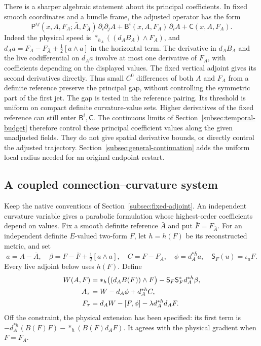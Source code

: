 \documentclass[11pt]{article}
\numberwithin{equation}{section}
\theoremstyle{definition}
\theoremstyle{remark}
\begin{document}
There is a sharper algebraic statement about its principal coefficients.
In fixed smooth coordinates and a bundle frame, the adjusted operator
has the form
\[
 \mathsf P^{ij}(x,A,F_A;\bar A,F_{\bar A})\,\partial_i\partial_j A
 +\mathsf B^i(x,A,F_A)\,\partial_iA+\mathsf C(x,A,F_A).
\]
Indeed the physical speed is
$*_{h_A}((d_AB_A)\wedge F_A)$, and
$d_Aa=F_A-F_{\bar A}+\tfrac12[a\wedge a]$ in the horizontal
term. The derivative in $d_AB_A$ and the live codifferential on
$d_Aa$ involve at most one derivative of $F_A$, with coefficients
depending on the displayed values.
The fixed vertical adjoint gives its second derivatives directly.
Thus small $C^0$ differences of both $A$ and $F_A$ from a definite
reference preserve the principal gap, without controlling the
symmetric part of the first jet. The gap is tested in the reference
pairing. Its threshold is uniform on compact definite curvature-value
sets. Higher derivatives of the fixed reference can still enter
$\mathsf B^i,\mathsf C$.
The continuous limits of Section~\ref{subsec:temporal-budget}
therefore control these principal coefficient values along the
given unadjusted fields. They do not give spatial derivative bounds,
or directly control the adjusted trajectory.
Section~\ref{subsec:general-continuation} adds the
uniform local radius needed for an original endpoint restart.

\subsection{A coupled connection--curvature system}
\label{subsec:coupled-curvature}

Keep the native conventions of Section~\ref{subsec:fixed-adjoint}.
An independent curvature variable gives a parabolic formulation
whose highest-order coefficients depend on values. Fix a smooth
definite reference $\bar A$ and put $\bar F=F_{\bar A}$.
For an independent definite $E$-valued two-form $F$, let
$h=h(F)$ be its reconstructed metric, and set
\[
 a=A-\bar A,\quad
 \beta=F-\bar F+\tfrac12[a\wedge a],\quad
 C=F-F_A,\quad \phi=d_A^{*\bar h}a,\quad
 \mathsf S_F(u)=\iota_uF .
\]
Every live adjoint below uses $h(F)$. Define
\begin{align}
 W(A,F)&=*_{h}\bigl((d_AB(F))\wedge F\bigr)
               -\mathsf S_F\mathsf S_F^*d_A^{*h}\beta,\notag\\
 A_\tau&=W-d_A\phi+d_A^{*h}C,\label{flow:coupled-AF}\\
 F_\tau&=d_AW-[F,\phi]-\lambda d_A^{*h}d_AF.\notag
\end{align}
Off the constraint, the physical extension has been specified:
its first term is $-d_A^{*h}(B(F)F)-*_{h}(B(F)d_AF)$.
It agrees with the physical gradient when $F=F_A$.
\end{document}
